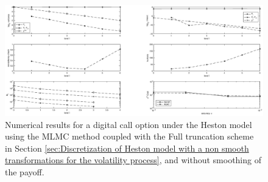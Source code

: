 \FloatBarrier
	\begin{figure}[h!]
\centering
\includegraphics[width=1.2\linewidth]{./figures/MLMC_binary_Heston_opt/without_smoothing/digital_option_set1_L_0_1_steps_L_6}

\caption{Numerical results for a digital call option under the Heston model using the MLMC method coupled with  the Full truncation scheme in Section \ref{sec:Discretization of Heston model with a non smooth transformations for the volatility process}, and without smoothing of the payoff.}
\label{fig:euler_digital_Heston_without_smoothing}
\end{figure}



